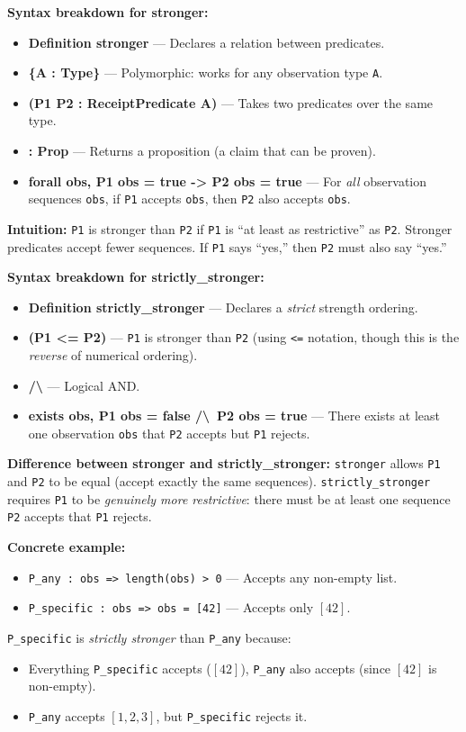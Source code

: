 \textbf{Syntax breakdown for stronger:}
\begin{itemize}
    \item \textbf{Definition stronger} — Declares a relation between predicates.
    \item \textbf{\{A : Type\}} — Polymorphic: works for any observation type \texttt{A}.
    \item \textbf{(P1 P2 : ReceiptPredicate A)} — Takes two predicates over the same type.
    \item \textbf{: Prop} — Returns a proposition (a claim that can be proven).
    \item \textbf{forall obs, P1 obs = true -> P2 obs = true} — For \textit{all} observation sequences \texttt{obs}, if \texttt{P1} accepts \texttt{obs}, then \texttt{P2} also accepts \texttt{obs}.
\end{itemize}

\textbf{Intuition:} \texttt{P1} is stronger than \texttt{P2} if \texttt{P1} is ``at least as restrictive'' as \texttt{P2}. Stronger predicates accept fewer sequences. If \texttt{P1} says ``yes,'' then \texttt{P2} must also say ``yes.''

\textbf{Syntax breakdown for strictly\_stronger:}
\begin{itemize}
    \item \textbf{Definition strictly\_stronger} — Declares a \textit{strict} strength ordering.
    \item \textbf{(P1 <= P2)} — \texttt{P1} is stronger than \texttt{P2} (using \texttt{<=} notation, though this is the \textit{reverse} of numerical ordering).
    \item \textbf{/\textbackslash} — Logical AND.
    \item \textbf{exists obs, P1 obs = false /\textbackslash\ P2 obs = true} — There exists at least one observation \texttt{obs} that \texttt{P2} accepts but \texttt{P1} rejects.
\end{itemize}

\textbf{Difference between stronger and strictly\_stronger:} \texttt{stronger} allows \texttt{P1} and \texttt{P2} to be equal (accept exactly the same sequences). \texttt{strictly\_stronger} requires \texttt{P1} to be \textit{genuinely more restrictive}: there must be at least one sequence \texttt{P2} accepts that \texttt{P1} rejects.

\textbf{Concrete example:}
\begin{itemize}
    \item \texttt{P\_any : obs => length(obs) > 0} — Accepts any non-empty list.
    \item \texttt{P\_specific : obs => obs = [42]} — Accepts only $[42]$.
\end{itemize}
\texttt{P\_specific} is \textit{strictly stronger} than \texttt{P\_any} because:
\begin{itemize}
    \item Everything \texttt{P\_specific} accepts ($[42]$), \texttt{P\_any} also accepts (since $[42]$ is non-empty).
    \item \texttt{P\_any} accepts $[1, 2, 3]$, but \texttt{P\_specific} rejects it.
\end{itemize}


